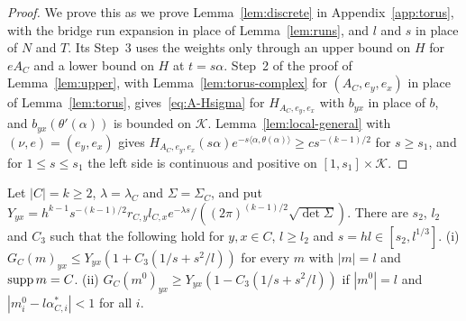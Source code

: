\begin{proof}
We prove this as we prove Lemma~\ref{lem:discrete} in Appendix~\ref{app:torus}, with the bridge run
expansion in place of Lemma~\ref{lem:runs}, and $l$ and $s$ in place of $N$ and $T$. Its Step~3
uses the weights only through an upper bound on $H$ for $eA_C$ and a lower bound on $H$ at
$t=s\alpha$. Step~2 of the proof of Lemma~\ref{lem:upper}, with Lemma~\ref{lem:torus-complex}
for $(A_C,e_y,e_x)$ in place of Lemma~\ref{lem:torus}, gives~\eqref{eq:A-Hsigma} for $H_{A_C,e_y,e_x}$
with $b_{yx}$ in place of $b$, and $b_{yx}(\theta'(\alpha))$ is bounded on $\mathcal K$.
Lemma~\ref{lem:local-general} with $(\nu,e)=(e_y,e_x)$ gives
$H_{A_C,e_y,e_x}(s\alpha)e^{-s\langle\alpha,\theta(\alpha)\rangle}\ge cs^{-(k-1)/2}$ for $s\ge s_1$,
and for $1\le s\le s_1$ the left side is continuous and positive on $[1,s_1]\times\mathcal K$.
\end{proof}

\begin{lemma}\label{lem:block-max}
Let $|C|=k\ge2$, $\lambda=\lambda_C$ and $\Sigma=\Sigma_C$, and put
$Y_{yx}=h^{k-1}s^{-(k-1)/2}r_{C,y}l_{C,x}e^{-\lambda s}/((2\pi)^{(k-1)/2}\sqrt{\det\Sigma})$. There
are $s_2$, $l_2$ and $C_3$ such that the following hold for $y,x\in C$, $l\ge l_2$ and
$s=hl\in[s_2,l^{1/3}]$. \textup{(i)} $G_C(m)_{yx}\le Y_{yx}(1+C_3(1/s+s^2/l))$ for every $m$ with
$|m|=l$ and $\operatorname{supp} m=C$. \textup{(ii)} $G_C(m^0)_{yx}\ge Y_{yx}(1-C_3(1/s+s^2/l))$ if $|m^0|=l$ and
$|m^0_i-l\alpha^*_{C,i}|<1$ for all $i$.
\end{lemma}

